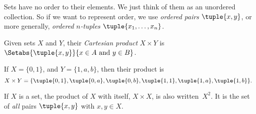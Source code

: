 \documentclass[../../include/open-logic-section]{subfiles}
\begin{document}

\begin{explain}
Sets have no order to their elements. We just think of them as an
unordered collection. So if we want to represent order, we use
\emph{ordered pairs} $\tuple{x, y}$, or more generally,
\emph{ordered $n$-tuples} $\tuple{x_1, \dots, x_n}$.
\end{explain}

\begin{defn} 
Given sets $X$ and $Y$, their \emph{Cartesian product} $X \times Y$ is
$\Setabs{\tuple{x, y}}{x \in A \text{ and } y \in B}$.
\end{defn}

\begin{ex}
If $X = \{0, 1\}$, and $Y = \{1, a, b\}$, then their product is
\[
X \times Y = \{ \tuple{0, 1}, \tuple{0, a}, \tuple{0, b},
    \tuple{1, 1}, \tuple{1, a}, \tuple{1, b} \}.
\]
\end{ex}

\begin{ex}
If $X$ is a set, the product of $X$ with itself, $X \times X$, is also
written~$X^2$. It is the set of \emph{all} pairs $\tuple{x, y}$ with
$x, y \in X$.
\end{ex}
\end{document}
